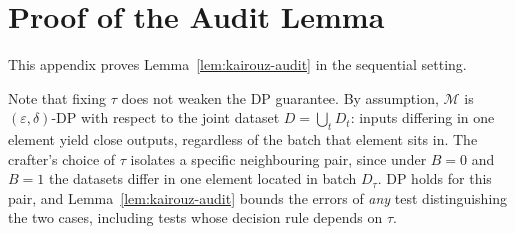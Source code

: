 \documentclass{article}
\theoremstyle{plain}
\theoremstyle{definition}
\theoremstyle{remark}
\newcommand{\cM}{\ensuremath{\mathcal{M}}}
\newcommand{\cA}{\ensuremath{\mathcal{A}}}
\begin{document}
\section{Proof of the Audit Lemma}
\label{app:audit-lemma-proof}

This appendix proves Lemma~\ref{lem:kairouz-audit} in the sequential setting. %


Note that fixing $\tau$ does not weaken the DP guarantee. By assumption, $\cM$ is $(\varepsilon,\delta)$-DP with respect to the joint dataset $D=\bigcup_t D_t$: inputs differing in one element yield close outputs, regardless of the batch that element sits in. The crafter's choice of $\tau$ isolates a specific neighbouring pair, since under $B=0$ and $B=1$ the datasets differ in one element located in batch $D_\tau$. DP holds for this pair, and Lemma~\ref{lem:kairouz-audit} bounds the errors of \emph{any} test distinguishing the two cases, including tests whose decision rule depends on $\tau$.%


\kairouzaudit*
\end{document}
